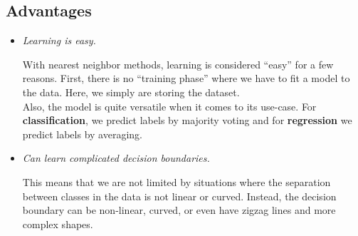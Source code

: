 \documentclass{report}
\begin{document}
\subsection{Advantages}
  \begin{itemize}
    \item \emph{Learning is easy.}
    
    With nearest neighbor methods, learning is considered ``easy'' for a few
    reasons. First, there is no ``training phase'' where we have to fit a model
    to the data. Here, we simply are storing the dataset.
    \\[12pt]
    Also, the model is quite versatile when it comes to its use-case. For
    \textbf{classification}, we predict labels by majority voting and for
    \textbf{regression} we predict labels by averaging.

    \item \emph{Can learn complicated decision boundaries.}
    
    This means that we are not limited by situations where the separation
    between classes in the data is not linear or curved. Instead, the
    decision boundary can be non-linear, curved, or even have zigzag lines and
    more complex shapes.
  \end{itemize}
\end{document}
